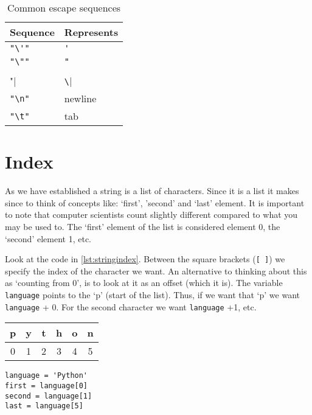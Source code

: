 	\begin{table}[htb]
		\centering
		\caption{Common escape sequences}\label{table:escape}
		\begin{tabular}{ l | l }
			Sequence	& Represents 	\\ \hline
			\lstinline|"\'"|	& \verb|'|	\\ \hline
			\lstinline|"\""|	& \verb|"|	\\ \hline
			\lstinline|"\\"|	& \verb|\|	\\ \hline
			\lstinline|"\n"|	& newline	\\ \hline
			\lstinline|"\t"|	& tab	\\
		\end{tabular}
	\end{table}
	
	\section{Index}
	
	As we have established a string is a list of characters.
	Since it is a list it makes since to think of concepts like: `first', 'second' and `last' element.
	It is important to note that computer scientists count slightly different compared to what you may be used to.
	The `first' element of the list is considered element 0, the `second' element 1, etc.
	
	Look at the code in \autoref{lst:stringindex}.
	Between the square brackets (\lstinline|[ ]|) we specify the index of the character we want.
	An alternative to thinking about this as `counting from 0', is to look at it as an offset (which it is).
	The variable \lstinline|language| points to the `p' (start of the list).
	Thus, if we want that `p' we want \lstinline|language| + 0.
	For the second character we want \lstinline|language| +1, etc.
	
	\begin{center}
		\begin{tabular}{ | c | c | c | c | c | c | }
			\hline
			p&y&t&h&o&n \\ \hline
			0&1&2&3&4&5 \\ \hline
		\end{tabular}
	\end{center}
	
	\begin{lstlisting}[caption={Getting characters from a string.}, label={lst:stringindex}]
language = 'Python'
first = language[0]
second = language[1]
last = language[5]
	\end{lstlisting}
	

